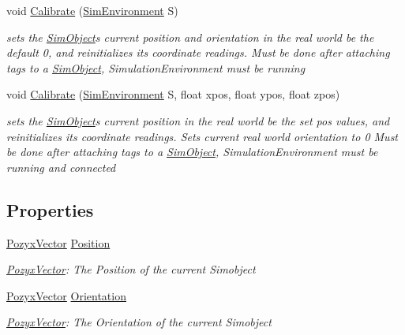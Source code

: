 \begin{DoxyCompactItemize}
void \hyperlink{class_pozyx_subscriber_1_1_framework_1_1_sim_object_a1c648d512ff2292a3f0f084f54ab9cae}{Calibrate} (\hyperlink{class_pozyx_subscriber_1_1_sim_environment}{Sim\+Environment} S)
\begin{DoxyCompactList}\small\item\em sets the \hyperlink{class_pozyx_subscriber_1_1_framework_1_1_sim_object}{Sim\+Object}\textquotesingle{}s current position and orientation in the real world be the default 0, and reinitializes its coordinate readings. Must be done after attaching tags to a \hyperlink{class_pozyx_subscriber_1_1_framework_1_1_sim_object}{Sim\+Object}, Simulation\+Environment must be running \end{DoxyCompactList}\item 
void \hyperlink{class_pozyx_subscriber_1_1_framework_1_1_sim_object_abf399bdb3a84bd97df64b9cf47482cbd}{Calibrate} (\hyperlink{class_pozyx_subscriber_1_1_sim_environment}{Sim\+Environment} S, float xpos, float ypos, float zpos)
\begin{DoxyCompactList}\small\item\em sets the \hyperlink{class_pozyx_subscriber_1_1_framework_1_1_sim_object}{Sim\+Object}\textquotesingle{}s current position in the real world be the set pos values, and reinitializes its coordinate readings. Sets current real world orientation to 0 Must be done after attaching tags to a \hyperlink{class_pozyx_subscriber_1_1_framework_1_1_sim_object}{Sim\+Object}, Simulation\+Environment must be running and connected \end{DoxyCompactList}\end{DoxyCompactItemize}
\subsection*{Properties}
\begin{DoxyCompactItemize}
\item 
\hyperlink{struct_pozyx_subscriber_1_1_framework_1_1_pozyx_vector}{Pozyx\+Vector} \hyperlink{class_pozyx_subscriber_1_1_framework_1_1_sim_object_a154ba70dc97ab79384ebecae98d69e18}{Position}
\begin{DoxyCompactList}\small\item\em \hyperlink{struct_pozyx_subscriber_1_1_framework_1_1_pozyx_vector}{Pozyx\+Vector}\+: The Position of the current Simobject \end{DoxyCompactList}\item 
\hyperlink{struct_pozyx_subscriber_1_1_framework_1_1_pozyx_vector}{Pozyx\+Vector} \hyperlink{class_pozyx_subscriber_1_1_framework_1_1_sim_object_a7bef5a38ed8e44b431f1c959e0f550df}{Orientation}
\begin{DoxyCompactList}\small\item\em \hyperlink{struct_pozyx_subscriber_1_1_framework_1_1_pozyx_vector}{Pozyx\+Vector}\+: The Orientation of the current Simobject \end{DoxyCompactList}\end{DoxyCompactItemize}
